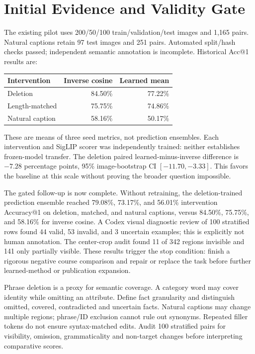 \documentclass[10pt,twocolumn]{article}
\begin{document}
\section{Initial Evidence and Validity Gate}
The existing pilot uses 200/50/100 train/validation/test images and 1,165 pairs. Natural captions retain 97 test images and 251 pairs. Automated split/hash checks passed; independent semantic annotation is incomplete. Historical Acc@1 results are:
\begin{center}\small
\begin{tabular}{lrr}
\toprule
Intervention & Inverse cosine & Learned mean\\
\midrule
Deletion & 84.50\% & 77.22\%\\
Length-matched & 75.75\% & 74.86\%\\
Natural caption & 58.16\% & 50.17\%\\
\bottomrule
\end{tabular}
\end{center}
These are means of three seed metrics, not prediction ensembles. Each intervention and SigLIP scorer was independently trained: neither establishes frozen-model transfer. The deletion paired learned-minus-inverse difference is $-7.28$ percentage points, 95\% image-bootstrap CI $[-11.70,-3.33]$. This favors the baseline at this scale without proving the broader question impossible.

The gated follow-up is now complete. Without retraining, the deletion-trained prediction ensemble reached 79.08\%, 73.17\%, and 56.01\% intervention Accuracy@1 on deletion, matched, and natural captions, versus 84.50\%, 75.75\%, and 58.16\% for inverse cosine. A Codex visual diagnostic review of 100 stratified rows found 44 valid, 53 invalid, and 3 uncertain examples; this is explicitly not human annotation. The center-crop audit found 11 of 342 regions invisible and 141 only partially visible. These results trigger the stop condition: finish a rigorous negative course comparison and repair or replace the task before further learned-method or publication expansion.

Phrase deletion is a proxy for semantic coverage. A category word may cover identity while omitting an attribute. Define fact granularity and distinguish omitted, covered, contradicted and uncertain facts. Natural captions may change multiple regions; phrase/ID exclusion cannot rule out synonyms. Repeated filler tokens do not ensure syntax-matched edits. Audit 100 stratified pairs for visibility, omission, grammaticality and non-target changes before interpreting comparative scores.
\end{document}
